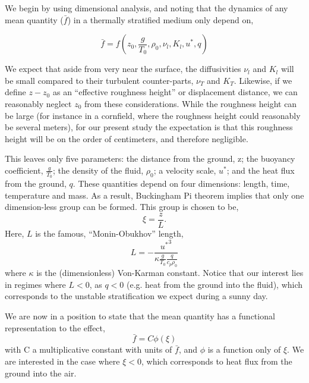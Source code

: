 %
%

We begin by using dimensional analysis, and noting that the dynamics of
any mean quantity ($\bar f$) in a thermally stratified medium only depend on,

\begin{equation}
\bar f = f(z_0,\frac{g}{T_0},\rho_0,\nu_l,K_l,u^*,q)
\end{equation}

We expect that aside from very near the surface, the diffusivities $\nu_l$
and $K_l$ will be small compared to their turbulent counter-parts, $\nu_T$
and $K_T$. Likewise, if we define $z-z_0$ as an ``effective roughness
height'' or displacement distance, we can reasonably neglect $z_0$ from these
considerations. While the roughness height can be large (for instance in
a cornfield, where the roughness height could reasonably be several
meters), for our present study the expectation is that this roughness
height will be on the order of centimeters\cite{oke1987boundary}, and
therefore negligible.  

This leaves only five parameters: the distance from the ground, z; the
buoyancy coefficient, $\frac{g}{T_0}$; the density of the fluid,
$\rho_0$; a velocity scale, $u^*$; and the heat flux from the ground,
$q$. 
%
% 
These quantities depend on
four dimensions: length, time, temperature and mass. As a result, 
Buckingham Pi theorem implies that only one dimension-less group can be
formed\cite{munson2012fundamentals}. This group is chosen to be,
\begin{equation}
 \xi = \frac{z}{L}.
\end{equation}
Here, $L$ is the famous, ``Monin-Obukhov'' length,
\begin{equation}
 L = -\frac{{u^*}^3}{\kappa \frac{g}{T_0} \frac{q}{c_p \rho_0}}
\end{equation}
where $\kappa$ is the (dimensionless) Von-Karman constant. Notice that
our interest lies in regimes where $L<0$, as $q<0$ (e.g. heat from the
ground into the fluid), which corresponds to the unstable stratification 
we expect during a sunny day. 

We are now in a position to state that the mean quantity has a
functional representation to the effect,
\begin{equation}
 \bar f = C \phi(\xi)
\end{equation}
with C a multiplicative constant with units of $\bar f$, and $\phi$ is a
function only of $\xi$. We are interested in the case where $\xi<0$, which
corresponds to heat flux from the ground into the air.  

